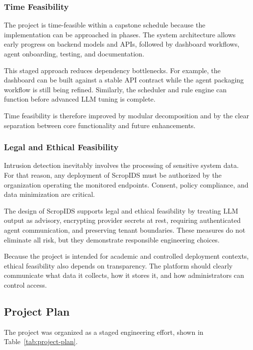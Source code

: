 \documentclass[12pt,a4paper]{article}
\begin{document}
\subsubsection{Time Feasibility}
The project is time-feasible within a capstone schedule because the implementation can be approached in phases. The system architecture allows early progress on backend models and APIs, followed by dashboard workflows, agent onboarding, testing, and documentation.

This staged approach reduces dependency bottlenecks. For example, the dashboard can be built against a stable API contract while the agent packaging workflow is still being refined. Similarly, the scheduler and rule engine can function before advanced LLM tuning is complete.

Time feasibility is therefore improved by modular decomposition and by the clear separation between core functionality and future enhancements.

\subsubsection{Legal and Ethical Feasibility}
Intrusion detection inevitably involves the processing of sensitive system data. For that reason, any deployment of ScropIDS must be authorized by the organization operating the monitored endpoints. Consent, policy compliance, and data minimization are critical.

The design of ScropIDS supports legal and ethical feasibility by treating LLM output as advisory, encrypting provider secrets at rest, requiring authenticated agent communication, and preserving tenant boundaries. These measures do not eliminate all risk, but they demonstrate responsible engineering choices.

Because the project is intended for academic and controlled deployment contexts, ethical feasibility also depends on transparency. The platform should clearly communicate what data it collects, how it stores it, and how administrators can control access.

\subsection{Project Plan}
The project was organized as a staged engineering effort, shown in Table~\ref{tab:project-plan}.
\end{document}

